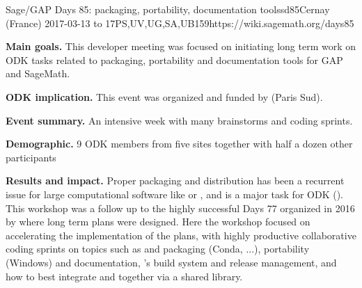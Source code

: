 \begin{event}{Sage/GAP Days 85: packaging, portability, documentation tools}{sd85}{Cernay (France) 2017-03-13 to 17}{PS,UV,UG,SA,UB}{15}{9}{https://wiki.sagemath.org/days85}

  \textbf{Main goals.} This developer meeting was focused on
  initiating long term work on ODK tasks related to packaging,
  portability and documentation tools for GAP and SageMath.

  \textbf{ODK implication.} This event was organized and funded by
  \ODK (Paris Sud).

  \textbf{Event summary.} An intensive week with many brainstorms and coding sprints.

  \textbf{Demographic.} 9 ODK members from five sites together with
  half a dozen other participants

  \textbf{Results and impact.} Proper packaging and distribution has
  been a recurrent issue for large computational software like \Sage
  or \GAP, and is a major task for ODK
  (). This workshop
  was a follow up to the highly successful \Sage Days 77 organized in
  2016 by \ODK where long term plans were designed. Here the workshop
  focused on accelerating the implementation of the plans, with highly
  productive collaborative coding sprints on topics such as \GAP and
  \Sage packaging (Conda, ...), \Sage portability (Windows) and
  documentation, \GAP's build system and release management, and how
  to best integrate \GAP and \Sage together via a shared library.
\end{event}
